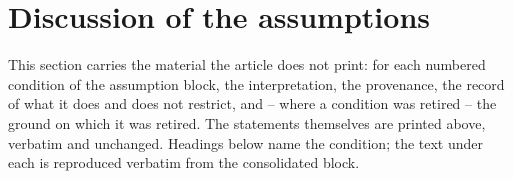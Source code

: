 %

\section*{Discussion of the assumptions}

\noindent This section carries the material the article does not print: for each
numbered condition of the assumption block, the interpretation, the provenance,
the record of what it does and does not restrict, and -- where a condition was
retired -- the ground on which it was retired. The statements themselves are
printed above, verbatim and unchanged. Headings below name the condition; the
text under each is reproduced verbatim from the consolidated block.


